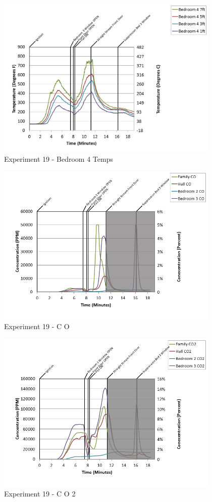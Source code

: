 \documentclass{article}
\begin{document}
\begin{appendices}
\clearpage

\begin{figure}[h!]
	\centering
	\includegraphics[height=3.05in]{0_Images/Results_Charts/Exp_19_Charts/Bedroom4Temps.png}
	\caption{Experiment 19 - Bedroom 4 Temps}
\end{figure}


\begin{figure}[h!]
	\centering
	\includegraphics[height=3.05in]{0_Images/Results_Charts/Exp_19_Charts/CO.png}
	\caption{Experiment 19 - C O}
\end{figure}

\clearpage

\begin{figure}[h!]
	\centering
	\includegraphics[height=3.05in]{0_Images/Results_Charts/Exp_19_Charts/CO2.png}
	\caption{Experiment 19 - C O 2}
\end{figure}



\end{appendices}
\end{document}
